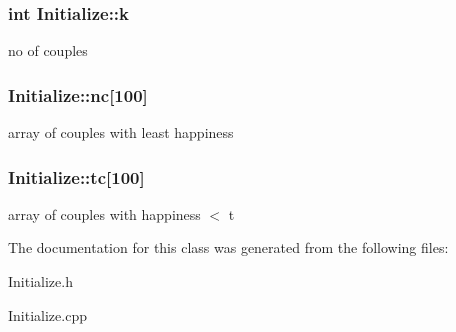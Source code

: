 \subsubsection[{\texorpdfstring{k}{k}}]{\setlength{\rightskip}{0pt plus 5cm}int Initialize\+::k}\hypertarget{classInitialize_ac259c3b0b9d9f84312db8c235f3296f0}{}\label{classInitialize_ac259c3b0b9d9f84312db8c235f3296f0}
no of couples 
\subsubsection[{\texorpdfstring{nc}{nc}}]{ Initialize\+::nc\mbox{[}100\mbox{]}}\hypertarget{classInitialize_aec3f194771e24ddfa062353ec0990039}{}\label{classInitialize_aec3f194771e24ddfa062353ec0990039}
array of couples with least happiness 
\subsubsection[{\texorpdfstring{tc}{tc}}]{ Initialize\+::tc\mbox{[}100\mbox{]}}\hypertarget{classInitialize_a04d71451f0caaf3d6dc5684d18ee7c62}{}\label{classInitialize_a04d71451f0caaf3d6dc5684d18ee7c62}
array of couples with happiness $<$ t 

The documentation for this class was generated from the following files\+:\begin{DoxyCompactItemize}
\item 
Initialize.\+h\item 
Initialize.\+cpp\end{DoxyCompactItemize}
